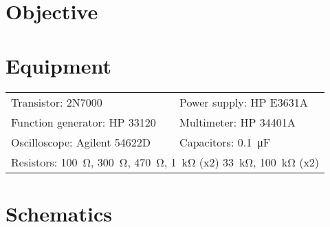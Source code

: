 

\section{Objective}
\label{sec:objective}

\section{Equipment}
\label{sec:equipment}

\begin{tabular}{ll}
  \centering
  Transistor: 2N7000               & Power supply: HP E3631A            \\
  Function generator: HP 33120 & Multimeter: HP 34401A              \\
  Oscilloscope: Agilent 54622D & Capacitors: \SI{0.1}{\micro\farad} \\
  \multicolumn{2}{l}{Resistors: \SI{100}{\ohm}, \SI{300}{\ohm}, \SI{470}{\ohm}, \SI{1}{\kilo\ohm} (x2) \SI{33}{\kilo\ohm}, \SI{100}{\kilo\ohm} (x2)} \\
\end{tabular}

\section{Schematics}
\label{sec:schematics}



